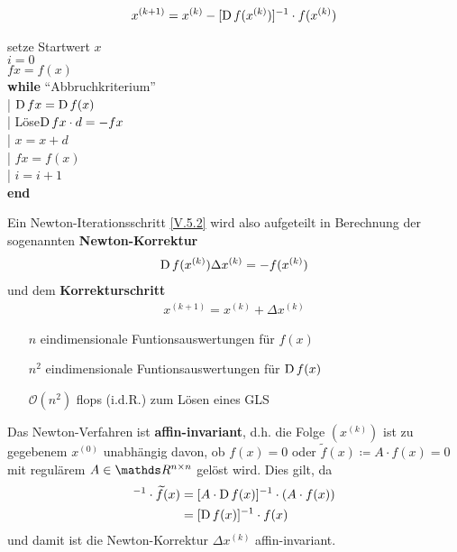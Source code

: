 \begin{gather}
  x^{(k+1)} = x^{(k)} -[\operatorname{D} f(x^{(k)})]^{-1}\cdot f(x^{(k)})
  \label{V.5.2}
\end{gather}

\begin{pseudocode}{0.5\linewidth}
  setze Startwert $x$ \\
  $i=0$ \\
  $fx= f(x)$ \\
  \textbf{while} \enquote{Abbruchkriterium} \\
  |	\> $\operatorname{D} fx = \operatorname{D} f(x)$ \\
  |	\> Löse\footnotemark $\operatorname{D} fx\cdot d=-fx$ \\
  |	\> $x=x+d$ \\
  |	\> $fx=f(x)$\\
  |	\> $i=i+1$\\
  \textbf{end}
\end{pseudocode}

\begin{Beme}
  Ein Newton-Iterationsschritt \eqref{V.5.2} wird also 
  aufgeteilt in Berechnung der sogenannten 
  \textbf{Newton-Korrektur}
  \begin{gather}
    \operatorname{D} f(x^{(k)})\Delta x^{(k)} = -f(x^{(k)}) \label{V.5.3}
  \end{gather}
  und dem \textbf{Korrekturschritt}
  \begin{gather}
    x^{(k+1)}= x^{(k)}+\Delta x^{(k)} \label{V.5.4}
  \end{gather}
\end{Beme}


\begin{itemize}
\item[\textbf{$n$}] eindimensionale Funtionsauswertungen für $f(x)$
\item[\textbf{$n^2$}] eindimensionale Funtionsauswertungen für $\operatorname{D} f(x)$
\item[$\mathcal{O}(n^2)$] flops (i.d.R.) zum Lösen eines GLS
\end{itemize}


\begin{Beme}
  \label{5.5.5}
  Das Newton-Verfahren ist \textbf{affin-invariant},
  d.h. die Folge $(x^{(k)})$ ist zu gegebenem $x^{(0)}$ unabhängig davon,
  ob $f(x)=0$ oder $\widetilde{f}(x)\coloneqq A\cdot f(x) =0$
  mit regulärem $A\in \Renn $ gelöst wird.
  Dies gilt, da 
  \begin{align*}
    [D\widetilde{f}(x)]^{-1} \cdot \widetilde{f}(x)
    &= [A\cdot \D f(x)]^{-1} \cdot (A\cdot f(x))\\
    &= [\D f(x)]^{-1} \cdot f(x)
  \end{align*}
  und damit ist die Newton-Korrektur $\Delta x^{(k)}$ affin-invariant.
\end{Beme}


